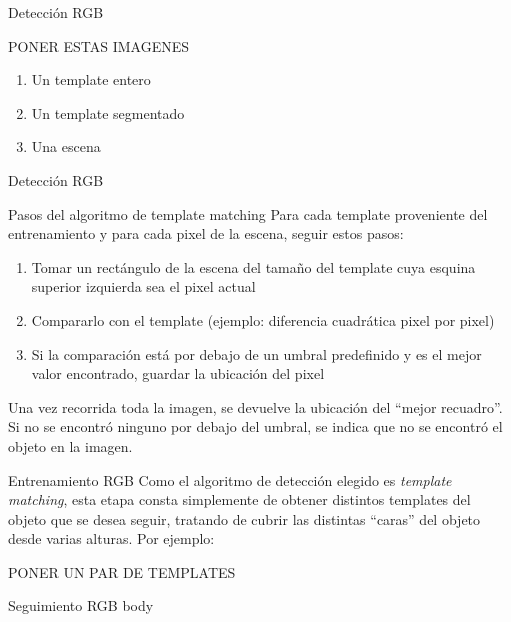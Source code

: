 \documentclass[]{beamer}
\begin{document}
\begin{frame}[t]{Detección RGB}

    PONER ESTAS IMAGENES
    \begin{enumerate}
        \item Un template entero
        \item Un template segmentado
        \item Una escena
    \end{enumerate}
\end{frame}



\begin{frame}[t]{Detección RGB}
    \begin{block}{Pasos del algoritmo de template matching}
        Para cada template proveniente del entrenamiento y para cada pixel de la escena, seguir estos pasos:
        \begin{enumerate}
            \item Tomar un rectángulo de la escena del tamaño del template cuya esquina superior izquierda sea el pixel actual
            \item Compararlo con el template (ejemplo: diferencia cuadrática pixel por pixel)
            \item Si la comparación está por debajo de un umbral predefinido y es el mejor valor encontrado, guardar la ubicación del pixel
        \end{enumerate}
        Una vez recorrida toda la imagen, se devuelve la ubicación del ``mejor recuadro''. Si no se encontró ninguno por debajo del umbral, se indica que no se encontró el objeto en la imagen.
    \end{block}
\end{frame}


\begin{frame}[t]{Entrenamiento RGB}
    Como el algoritmo de detección elegido es \textit{template matching}, esta etapa consta simplemente de obtener distintos templates del objeto que se desea seguir, tratando de cubrir las distintas ``caras'' del objeto desde varias alturas. Por ejemplo:
    \begin{block}
        PONER UN PAR DE TEMPLATES
    \end{block}
\end{frame}


\begin{frame}[t]{Seguimiento RGB}
    body
\end{frame}
\end{document}
